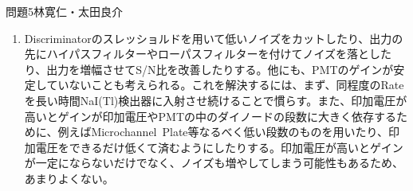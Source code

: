 \documentclass[fleqn]{jbook}
\begin{document}
\begin{answer}{問題5}{林寛仁・太田良介}
\begin{enumerate}
\begin{enumerate}
\begin{equation}
\end{equation}
となる。$T=10\mathrm{\mu s}$だから、その概形は図の様になる。
	\begin{figure}[h]
  		\begin{center}
    	\caption{点Bにおける出力}
  		\end{center}
	\end{figure}
	\item 
Discriminatorのスレッショルドを用いて低いノイズをカットしたり、出力の先にハイパスフィルターやローパスフィルターを付けてノイズを落としたり、出力を増幅させてS/N比を改善したりする。他にも、PMTのゲインが安定していないことも考えられる。これを解決するには、まず、同程度のRateを長い時間NaI(Tl)検出器に入射させ続けることで慣らす。また、印加電圧が高いとゲインが印加電圧やPMTの中のダイノードの段数に大きく依存するために、例えばMicrochannel\ Plate等なるべく低い段数のものを用いたり、印加電圧をできるだけ低くて済むようにしたりする。印加電圧が高いとゲインが一定にならないだけでなく、ノイズも増やしてしまう可能性もあるため、あまりよくない。


\end{enumerate}
\end{enumerate}
\end{answer}
\end{document}
